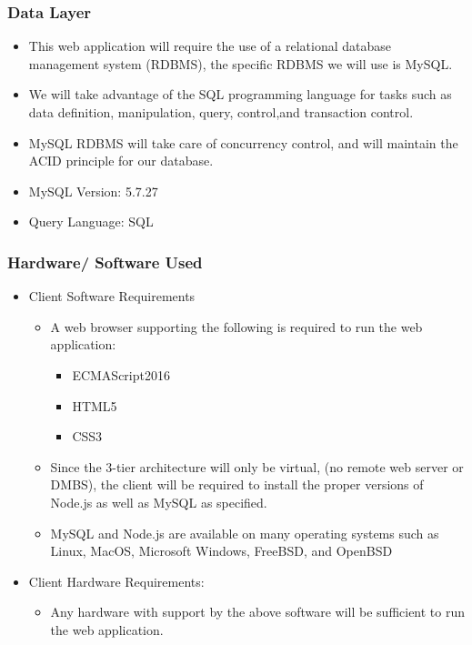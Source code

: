 \documentclass[letter, 12pt, titlepage]{article}
\begin{document}
\subsubsection{Data Layer}

\begin{itemize}

	\item	This web application will require the use of a relational database management system (RDBMS), the specific RDBMS we will use is  MySQL.
	\item We will take advantage of the SQL programming language for tasks such as data definition, manipulation, query, control,and transaction control.
	\item MySQL RDBMS will take care of concurrency control, and will maintain the ACID principle for our database.
	\item MySQL Version: 5.7.27
	\item Query Language: SQL
\end{itemize}
\subsubsection{Hardware/ Software Used}

\begin{itemize}

	\item Client Software Requirements
	      \begin{itemize}
		      \item A web browser supporting the following is required to run the web application:
		            \begin{itemize}
			            \item ECMAScript2016
			            \item HTML5
			            \item CSS3
		            \end{itemize}
		      \item Since the 3-tier architecture will only be virtual, (no remote web server or DMBS), the client will be required to install the proper versions of Node.js as well as MySQL as specified.

		      \item  MySQL and Node.js are available on many operating systems such as Linux, MacOS, Microsoft Windows, FreeBSD, and OpenBSD
	      \end{itemize}

	\item Client Hardware Requirements:
	      \begin{itemize}
		      \item Any hardware with support by the above software will be sufficient to run the web application.
	      \end{itemize}
\end{itemize}
\end{document}
